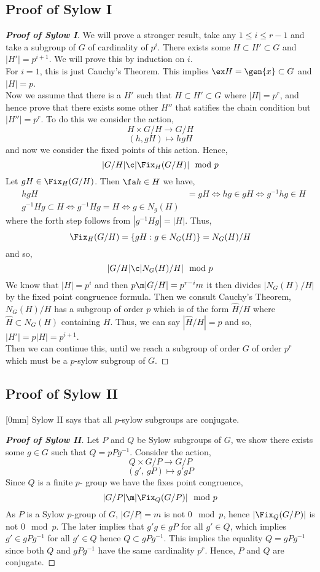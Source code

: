 \subsection{Proof of Sylow I}
\begin{proof}[\textbf{Proof of Sylow I}]
  We will prove a stronger result, take any $1 \le i \le r-1$ and take a subgroup of $G$ of cardinality of $p^i$. There exists some $H \subset H' \subset G$ and $|H'| = p^{i+1}$. We will prove this by induction on $i$.\\
  For $i = 1$, this is just Cauchy's Theorem. This implies $\ex H = \gen{x} \subset G$ and $|H| = p$.\\
  Now we assume that there is a $H'$ such that $H\subset H' \subset G$ where $|H| = p^r$, and hence prove that there exists some other $H''$ that satifies the chain condition but $|H''| = p^r$. To do this we consider the action,
  $$ H \times G/H \to G/H $$
  $$ (h, gH) \mapsto hgH $$
  and now we consider the fixed points of this action. Hence,
  $$ |G/H| \c |\Fix_H(G/H)|\mod p $$
  Let $gH \in \Fix_H(G/H)$. Then $\fa h \in H$ we have,
  \begin{align*}
    &hgH &= gH \iff hg \in gH \iff g^{-1}hg \in H\\
    &g^{-1}Hg \subset H \iff g^{-1}Hg = H \iff g \in N_g(H)
  \end{align*}
  where the forth step follows from $|g^{-1}Hg| = |H|$. Thus,
  $$ \Fix_H(G/H) = \{gH : g \in N_G(H)\} = N_G(H)/H $$
  and so,
  $$ |G/H| \c |N_G(H)/ H|\mod p $$
  We know that $|H| = p^i$ and then $p \m |G/H| = p^{r-i}m$ it then divides $|N_G(H)/H|$ by the fixed point congruence formula. Then we consult Cauchy's Theorem, $N_G(H)/H$ has a subgroup of order $p$ which is of the form $\hat H/H$ where $\hat H \subset N_G(H)$ containing $H$. Thus, we can say $|\hat H/H| = p$ and so, $|H'| = p|H| = p^{i+1}$.\\
  Then we can continue this, until we reach a subgroup of order $G$ of order $p^r$ which must be a $p$-sylow subgroup of $G$.
\end{proof}

\subsection{Proof of Sylow II}[0mm]
Sylow II says that all $p$-sylow subgroups are conjugate.
\begin{proof}[\textbf{Proof of Sylow II}]
  Let $P$ and $Q$ be Sylow subgroups of $G$, we show there exists some $g \in G$ such that $Q = pPg^{-1}$. Consider the action,
  $$ Q \times G/P \to G/P $$
  $$ (g',\,gP) \mapsto g'gP $$
  Since $Q$ is a finite $p$- group we have the fixes point congruence,
  $$ |G/P| \m |\Fix_Q(G/P)|\mod p $$
  As $P$ is a Sylow $p$-group of $G$, $|G/P| = m$ is not $0 \mod p$, hence $|\Fix_Q(G/P)|$ is not $0\mod p$. The later implies that $g'g \in gP$ for all $g' \in Q$, which implies $g' \in gPg^{-1}$ for all $g' \in Q$ hence $Q \subset gPg^{-1}$. This implies the equality $Q = gPg^{-1}$ since both $Q$ and $gPg^{-1}$ have the same cardinality $p^r$. Hence, $P$ and $Q$ are conjugate.
\end{proof}

